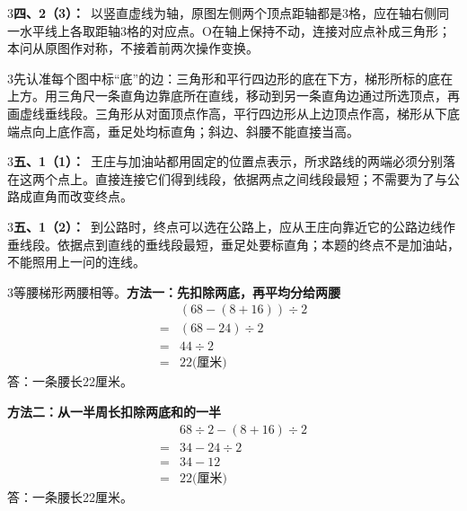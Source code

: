 \documentclass[multi=snippet,border={5bp 20bp 5bp 5bp}]{standalone}
\newenvironment{snippet}[3]{\begin{minipage}{#1bp}\color{answerred}\fontsize{#2}{#3}\selectfont\raggedright}{\end{minipage}}
\begin{document}
\begin{snippet}{505}{11.5}{14}\begin{multicols}{3}\raggedcolumns \textbf{四、2（3）：}\ 以竖直虚线为轴，原图左侧两个顶点距轴都是3格，应在轴右侧同一水平线上各取距轴3格的对应点。O在轴上保持不动，连接对应点补成三角形；本问从原图作对称，不接着前两次操作变换。\end{multicols}\end{snippet}
\begin{snippet}{505}{11.5}{14}\begin{multicols}{3}\raggedcolumns 先认准每个图中标“底”的边：三角形和平行四边形的底在下方，梯形所标的底在上方。用三角尺一条直角边靠底所在直线，移动到另一条直角边通过所选顶点，再画虚线垂线段。三角形从对面顶点作高，平行四边形从上边顶点作高，梯形从下底端点向上底作高，垂足处均标直角；斜边、斜腰不能直接当高。\end{multicols}\end{snippet}
\begin{snippet}{505}{11.5}{14}\begin{multicols}{3}\raggedcolumns \textbf{五、1（1）：}\ 王庄与加油站都用固定的位置点表示，所求路线的两端必须分别落在这两个点上。直接连接它们得到线段，依据两点之间线段最短；不需要为了与公路成直角而改变终点。\end{multicols}\end{snippet}
\begin{snippet}{505}{11.5}{14}\begin{multicols}{3}\raggedcolumns \textbf{五、1（2）：}\ 到公路时，终点可以选在公路上，应从王庄向靠近它的公路边线作垂线段。依据点到直线的垂线段最短，垂足处要标直角；本题的终点不是加油站，不能照用上一问的连线。\end{multicols}\end{snippet}
\begin{snippet}{505}{11.5}{14}\begin{multicols}{3}\raggedcolumns 等腰梯形两腰相等。\textbf{方法一：先扣除两底，再平均分给两腰}\[\begin{aligned}&(68-(8+16))\div2\\={}&(68-24)\div2\\={}&44\div2\\={}&22\text{(厘米)}\end{aligned}\]答：一条腰长22厘米。\par\textbf{方法二：从一半周长扣除两底和的一半}\[\begin{aligned}&68\div2-(8+16)\div2\\={}&34-24\div2\\={}&34-12\\={}&22\text{(厘米)}\end{aligned}\]答：一条腰长22厘米。\end{multicols}\end{snippet}
\end{document}
